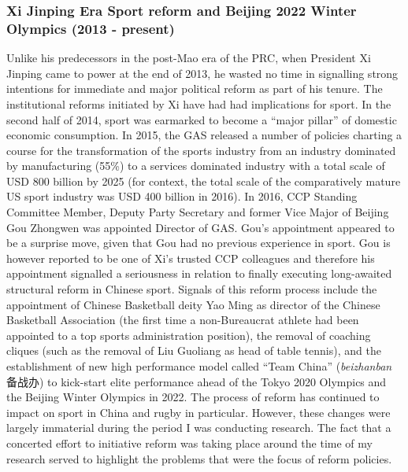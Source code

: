 \begin{CJK}{UTF8}{gbsn}
\subsubsection{Xi Jinping Era Sport reform and Beijing 2022 Winter Olympics (2013 - present)}

Unlike his predecessors in the post-Mao era of the PRC, when President Xi Jinping came to power at the end of 2013, he wasted no time in signalling strong intentions for immediate and major political reform as part of his tenure.  The institutional reforms initiated by Xi have had had implications for sport.  In the second half of 2014, sport was earmarked to become a ``major pillar'' of domestic economic consumption.  In 2015, the GAS released a number of policies charting a course for the transformation of the sports industry from an industry dominated by manufacturing (55\%) to a services dominated industry with a total scale of USD 800 billion by 2025 (for context, the total scale of the comparatively mature US sport industry was USD 400 billion in 2016).  In 2016, CCP Standing Committee Member, Deputy Party Secretary and former Vice Major of Beijing Gou Zhongwen was appointed Director of GAS.  Gou's appointment appeared to be a surprise move, given that Gou had no previous experience in sport. Gou is however reported to be one of Xi's trusted CCP colleagues and therefore his appointment signalled a seriousness in relation to finally executing long-awaited structural reform in Chinese sport.  Signals of this reform process include the appointment of Chinese Basketball deity Yao Ming as director of the Chinese Basketball Association (the first time a non-Bureaucrat athlete had been appointed to a top sports administration position), the removal of coaching cliques (such as the removal of Liu Guoliang as head of table tennis), and the establishment of new high performance model called ``Team China'' (\textit{beizhanban} 备战办) to kick-start elite performance ahead of the Tokyo 2020 Olympics and the Beijing Winter Olympics in 2022.  The process of reform has continued to impact on sport in China and rugby in particular.  However, these changes were largely immaterial during the period I was conducting research. The fact that a concerted effort to initiative reform was taking place around the time of my research served to highlight the problems that were the focus of reform policies.




\end{CJK}
